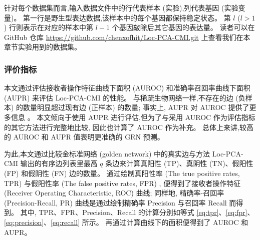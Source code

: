 \begin{table} [!htbp]
  \caption{实验所使用的数据集描述} 
  \label{tbl} 
\end{table} 

针对每个数据集而言,输入数据文件中的行代表样本 (实验),列代表基因 (实验变量)。
第一行是野生型表达数据,该样本中的每个基因都保持稳定状态。
第 $l$ ($l>1$) 行则表示在对应的样本中第 $l-1$ 个基因敲除后其它基因的表达量。
读者可以在 GitHub 仓库 \url{https://github.com/chenxofhit/Loc-PCA-CMI.git} 上查看我们在本章节实验用到的数据集。

\subsubsection{评价指标}

本文通过评估接收者操作特征曲线下面积 (AUROC) 和准确率召回率曲线下面积 (AUPR) 来评估 Loc-PCA-CMI 的性能。
与稀疏生物网络一样,不存在的边 (负样本) 的数量明显超过现有边 (正样本) 的数量; 
事实上, AUPR 对 AUROC 提供了更多信息  。
本文倾向于使用 AUPR 进行评估,但为了与采用 AUROC 作为评估指标的其它方法进行完整地比较,
因此也计算了 AUROC 作为补充。
总体上来讲,较高的 AUROC 和 AUPR 值表明更准确的 GRN 预测。

为此,本文通过比较金标准网络 (golden network) 中的真实边与方法 Loc-PCA-CMI 输出的有序边列表里最高 $q$ 条边来计算真阳性 (TP)、真阴性 (TN)、假阳性 (FP) 和假阴性 (FN) 边的数量。
通过绘制真阳性率 (The true positive rates, TPR) 与假阳性率 (The false positive rates, FPR) ,
便得到了接收者操作特征 (Receiver Operating Characteristic, ROC) 曲线; 
同样地,
精确率-召回率 (Precision-Recall, PR) 曲线是通过绘制精确率 Precision 与召回率 Recall 而得到。
其中, TPR、FPR、Precision、Recall 的计算分别如等式 \ref{eq:tpr}、\ref{eq:fpr}、\ref{eq:precision}、\ref{eq:recall} 所示。
再通过计算曲线下的面积便得到了 AUROC 和 AUPR。


